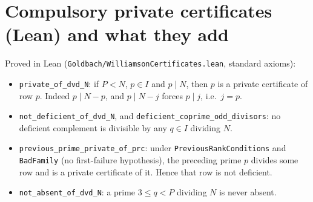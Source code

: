\documentclass[11pt,a4paper]{article}
\theoremstyle{remark}
\begin{document}
\section{Compulsory private certificates (Lean) and what they add}
Proved in Lean (\texttt{Goldbach/WilliamsonCertificates.lean}, standard axioms):
\begin{itemize}
\item \texttt{private\_of\_dvd\_N}: if $P<N$, $p\in I$ and $p\mid N$, then $p$ is a private certificate of row $p$. Indeed $p\mid N-p$, and
$p\mid N-j$ forces $p\mid j$, i.e.\ $j=p$.
\item \texttt{not\_deficient\_of\_dvd\_N}, and \texttt{deficient\_coprime\_odd\_divisors}: no deficient complement is divisible by
any $q\in I$ dividing $N$.
\item \texttt{previous\_prime\_private\_of\_prc}: under \texttt{PreviousRankConditions} and \texttt{BadFamily} (no first-failure
hypothesis), the preceding prime $p$ divides some row and is a private certificate of it. Hence that row is not deficient.
\item \texttt{not\_absent\_of\_dvd\_N}: a prime $3\le q<P$ dividing $N$ is never absent.
\end{itemize}
\end{document}
